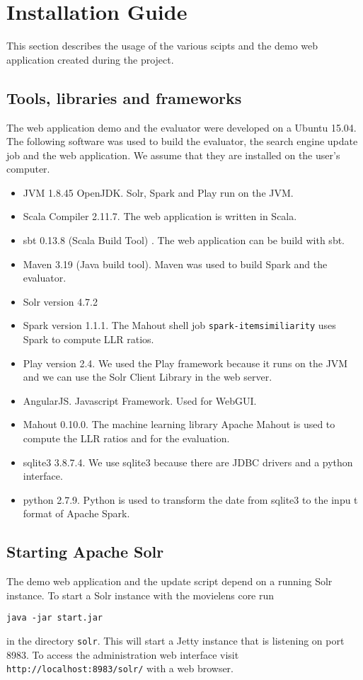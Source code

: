 \section{Installation Guide}
This section describes the usage of the various scipts and the demo web application created during the project.
\subsection{Tools, libraries and frameworks}
The web application demo and the evaluator were developed on a Ubuntu 15.04. 
The following software was used to build the evaluator, the search engine update job and the web application. We assume that they are installed on the user's computer.
\begin{itemize}
\item JVM 1.8.45 OpenJDK. Solr, Spark and Play run on the JVM.
\item Scala Compiler 2.11.7. The web application is written in Scala.
\item sbt 0.13.8 (Scala Build Tool) . The web application can be build with sbt.
\item Maven 3.19 (Java build tool). Maven was used to build Spark and the evaluator.
\item Solr version 4.7.2
\item Spark version 1.1.1. The Mahout shell job \verb|spark-itemsimiliarity| uses Spark to compute LLR ratios.
\item Play version 2.4. We used the Play framework because it runs on the JVM and we can use the Solr Client Library in the web server.
\item AngularJS. Javascript Framework. Used for WebGUI.
\item Mahout 0.10.0. The machine learning library Apache Mahout is used to compute the LLR ratios and for the evaluation.
\item sqlite3 3.8.7.4. We use sqlite3 because there are JDBC drivers and a python interface.
\item python 2.7.9. Python is used to transform the date from sqlite3 to the inpu
t format of Apache Spark.
\end{itemize}

\subsection{Starting Apache Solr}
\label{sec:startsolr}
The demo web application and the update script depend on a running Solr instance.
To start a Solr instance with the movielens core run
\begin{verbatim}
java -jar start.jar
\end{verbatim}
in the directory \verb|solr|.
This will start a Jetty instance that is listening on port 8983. To access the administration web interface visit \verb|http://localhost:8983/solr/| with a web browser.

